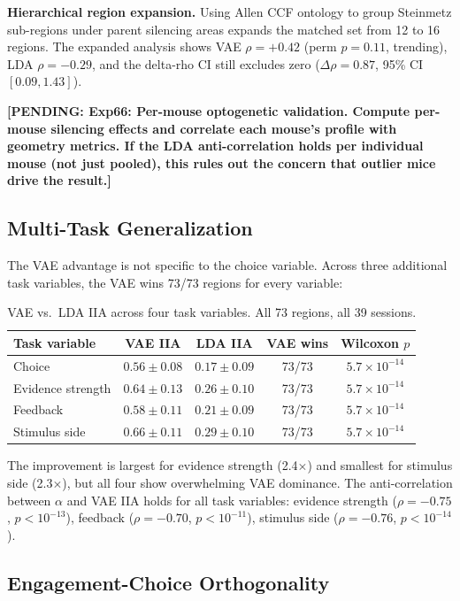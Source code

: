 \documentclass{article}
\newcommand{\pending}[1]{\textcolor{red!70!black}{\textbf{[PENDING: #1]}}}
\begin{document}
\textbf{Hierarchical region expansion.} Using Allen CCF ontology to group Steinmetz sub-regions under parent silencing areas expands the matched set from 12 to 16 regions. The expanded analysis shows VAE $\rho = +0.42$ (perm $p = 0.11$, trending), LDA $\rho = -0.29$, and the delta-rho CI still excludes zero ($\Delta\rho = 0.87$, 95\% CI $[0.09, 1.43]$).

\pending{Exp66: Per-mouse optogenetic validation. Compute per-mouse silencing effects and correlate each mouse's profile with geometry metrics. If the LDA anti-correlation holds per individual mouse (not just pooled), this rules out the concern that outlier mice drive the result.}

\subsection{Multi-Task Generalization}

The VAE advantage is not specific to the choice variable. Across three additional task variables, the VAE wins 73/73 regions for every variable:

\begin{table}[h]
\centering
\small
\caption{VAE vs.\ LDA IIA across four task variables. All 73 regions, all 39 sessions.}
\label{tab:multitask}
\begin{tabular}{lcccc}
\toprule
Task variable & VAE IIA & LDA IIA & VAE wins & Wilcoxon $p$ \\
\midrule
Choice & $0.56 \pm 0.08$ & $0.17 \pm 0.09$ & 73/73 & $5.7 \times 10^{-14}$ \\
Evidence strength & $0.64 \pm 0.13$ & $0.26 \pm 0.10$ & 73/73 & $5.7 \times 10^{-14}$ \\
Feedback & $0.58 \pm 0.11$ & $0.21 \pm 0.09$ & 73/73 & $5.7 \times 10^{-14}$ \\
Stimulus side & $0.66 \pm 0.11$ & $0.29 \pm 0.10$ & 73/73 & $5.7 \times 10^{-14}$ \\
\bottomrule
\end{tabular}
\end{table}

The improvement is largest for evidence strength (2.4$\times$) and smallest for stimulus side (2.3$\times$), but all four show overwhelming VAE dominance. The anti-correlation between $\alpha$ and VAE IIA holds for all task variables: evidence strength ($\rho = -0.75$, $p < 10^{-13}$), feedback ($\rho = -0.70$, $p < 10^{-11}$), stimulus side ($\rho = -0.76$, $p < 10^{-14}$).

\subsection{Engagement-Choice Orthogonality}
\end{document}

